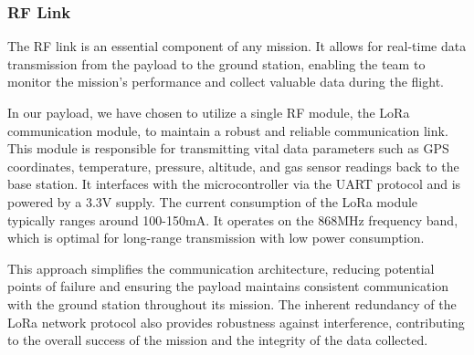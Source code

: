 \subsubsection{RF Link}
The RF link is an essential component of any mission. It allows for real-time data transmission from the payload to the ground station, enabling the team to monitor the mission's performance and collect valuable data during the flight.

In our payload, we have chosen to utilize a single RF module, the LoRa communication module, to maintain a robust and reliable communication link. This module is responsible for transmitting vital data parameters such as GPS coordinates, temperature, pressure, altitude, and gas sensor readings back to the base station. It interfaces with the microcontroller via the UART protocol and is powered by a 3.3V supply. The current consumption of the LoRa module typically ranges around 100-150mA. It operates on the 868MHz frequency band, which is optimal for long-range transmission with low power consumption.

This approach simplifies the communication architecture, reducing potential points of failure and ensuring the payload maintains consistent communication with the ground station throughout its mission. The inherent redundancy of the LoRa network protocol also provides robustness against interference, contributing to the overall success of the mission and the integrity of the data collected.

